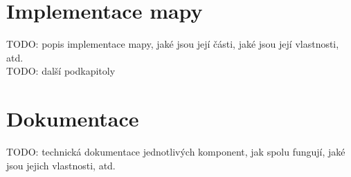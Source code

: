 \section{Implementace mapy}
\label{sec:implementace-mapa}
TODO: popis implementace mapy, jaké jsou její části, jaké jsou její vlastnosti, atd.\\
TODO: další podkapitoly

\section{Dokumentace}
\label{sec:implementace-dokumentace}
TODO: technická dokumentace jednotlivých komponent, jak spolu fungují, jaké jsou jejich vlastnosti, atd.
